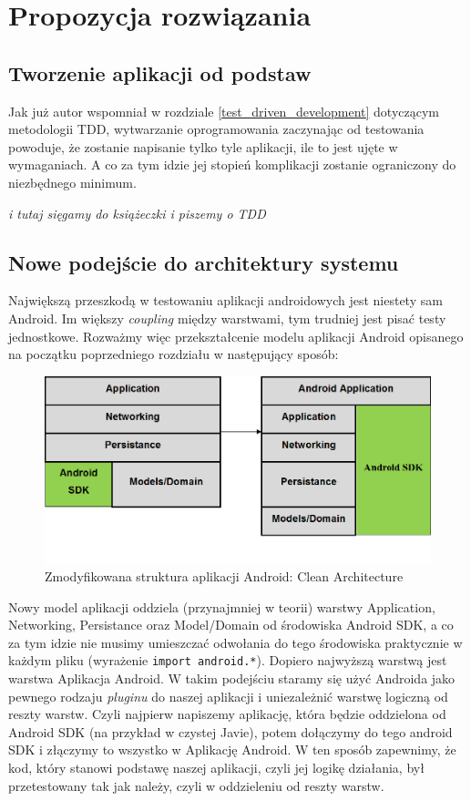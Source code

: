 \chapter{Propozycja rozwiązania}

\section{Tworzenie aplikacji od podstaw}
\label{nowa_aplikacja}
Jak już autor wspomniał w rozdziale \ref{test_driven_development} dotyczącym metodologii TDD, wytwarzanie oprogramowania zaczynając od testowania powoduje, że zostanie napisanie tylko tyle aplikacji, ile to jest ujęte w wymaganiach. A co za tym idzie jej stopień komplikacji zostanie ograniczony do niezbędnego minimum.

\textit{i tutaj sięgamy do książeczki i piszemy o TDD}

\section{Nowe podejście do architektury systemu}
\label{clean_architecture}
Największą przeszkodą w testowaniu aplikacji androidowych jest niestety sam Android. Im większy \textit{coupling} między warstwami, tym trudniej jest pisać testy jednostkowe. Rozważmy więc przekształcenie modelu aplikacji Android opisanego na początku poprzedniego rozdziału w następujący sposób:

\begin{figure}[!htb]
    \centering
    \includegraphics[width=13cm]{imgs/ch4_opis_rozwiazania_1.png}
    \caption
{Zmodyfikowana struktura aplikacji Android: Clean Architecture}
    \label{fig:opis_rozwiazania}
\end{figure} 

Nowy model aplikacji oddziela (przynajmniej w teorii) warstwy Application, Networking, Persistance oraz Model/Domain od środowiska Android SDK, a co za tym idzie nie musimy umieszczać odwołania do tego środowiska praktycznie w każdym pliku (wyrażenie \texttt{import android.*}). Dopiero najwyższą warstwą jest warstwa Aplikacja Android. W takim podejściu staramy się użyć Androida jako pewnego rodzaju \textit{pluginu} do naszej aplikacji i uniezależnić warstwę logiczną od reszty warstw. Czyli najpierw napiszemy aplikację, która będzie oddzielona od Android SDK (na przykład w czystej Javie), potem dołączymy do tego android SDK i złączymy to wszystko w Aplikację Android. W ten sposób zapewnimy, że kod, który stanowi podstawę naszej aplikacji, czyli jej logikę działania, był przetestowany tak jak należy, czyli w oddzieleniu od reszty warstw.
